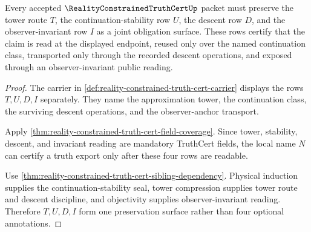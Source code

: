 \begin{theorem}
\label{thm:reality-constrained-truth-cert-stability-descent-invariant-obligation}
Every accepted $\RealityConstrainedTruthCertUp$ packet must preserve the tower route $T$, the continuation-stability row $U$, the descent row $D$, and the observer-invariant row $I$ as a joint obligation surface. These rows certify that the claim is read at the displayed endpoint, reused only over the named continuation class, transported only through the recorded descent operations, and exposed through an observer-invariant public reading.
\end{theorem}
\begin{proof}
The carrier in \autoref{def:reality-constrained-truth-cert-carrier} displays the rows $T,U,D,I$ separately. They name the approximation tower, the continuation class, the surviving descent operations, and the observer-anchor transport.

Apply \autoref{thm:reality-constrained-truth-cert-field-coverage}. Since tower, stability, descent, and invariant reading are mandatory TruthCert fields, the local name $N$ can certify a truth export only after these four rows are readable.

Use \autoref{thm:reality-constrained-truth-cert-sibling-dependency}. Physical induction supplies the continuation-stability seal, tower compression supplies tower route and descent discipline, and objectivity supplies observer-invariant reading. Therefore $T,U,D,I$ form one preservation surface rather than four optional annotations.
\end{proof}

